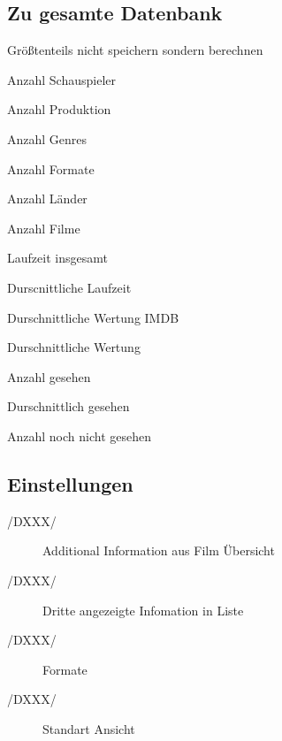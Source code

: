 \subsection{Zu gesamte Datenbank}
	\begin{description}
		\item Größtenteils nicht speichern sondern berechnen
		\item[/DXXX/] Anzahl Schauspieler
		\item[/DXXX/] Anzahl Produktion
		\item[/DXXX/] Anzahl Genres
		\item[/DXXX/] Anzahl Formate
		\item[/DXXX/] Anzahl Länder
		\item[/DXXX/] Anzahl Filme
		\item[/DXXX/] Laufzeit insgesamt
		\item[/DXXX/] Durscnittliche Laufzeit
		\item[/DXXX/] Durschnittliche Wertung IMDB
		\item[/DXXX/] Durschnittliche Wertung
		\item[/DXXX/] Anzahl gesehen
		\item[/DXXX/] Durschnittlich gesehen
		\item[/DXXX/] Anzahl noch nicht gesehen
	\end{description}
\subsection{Einstellungen}
	\begin{description}
		\item[/DXXX/] Additional Information aus Film Übersicht
		\item[/DXXX/] Dritte angezeigte Infomation in Liste
		\item[/DXXX/] Formate
		\item[/DXXX/] Standart Ansicht
	\end{description}




